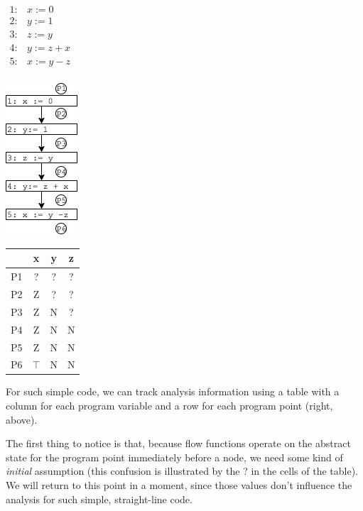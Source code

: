 \documentclass[11pt]{article}
\begin{document}
\begin{center}
\begin{minipage}[t][-9.7em][b]{0.30\textwidth} %
 $\begin{array}{ll}
 1: & x := 0\\
 2: & y := 1\\
 3: & z := y\\
 4: & y := z + x\\
 5: & x := y - z\\
\end{array}$
\end{minipage}
\hspace*{1em}%
\includegraphics[scale=0.75]{images/df-notes-cfg}
\hspace*{3em}
\begin{minipage}[t][-9.7em][b]{0.30\textwidth} %
\begin{tabular}{r | c c c}
  & x & y & z \\
\hline
P1 & ? & ? & ? \\
P2 & Z & ?  & ? \\
P3 & Z & N & ? \\
P4 & Z & N & N\\
P5 & Z & N & N\\
P6 & $\top$ & N & N\\
\end{tabular}
\end{minipage}
\end{center}

For such simple code, we can track analysis information using a table with a
column for each program variable and a row for each program point (right,
above). 

The first thing to notice is that, because flow functions operate on the
abstract state for the program point immediately before a node, we need some
kind of \emph{initial} assumption (this confusion is illustrated by the ? in
the cells of the table).  We will return to this point in a moment, since those
values don't influence the analysis for such simple, straight-line code. 
\end{document}
